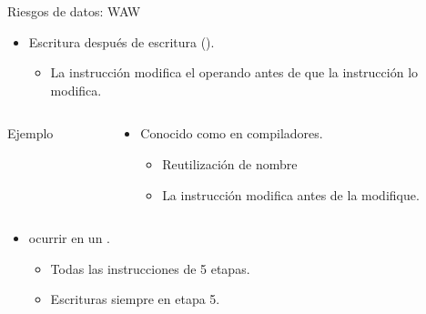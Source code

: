 \begin{frame}[t,fragile]{Riesgos de datos: WAW}
\begin{itemize}
  \item Escritura después de escritura ().
    \begin{itemize}
      \item La instrucción  modifica el operando antes de que la
            instrucción  lo modifica.
    \end{itemize}
\end{itemize}
\begin{columns}
\begin{column}{.25\textwidth}
\begin{block}{Ejemplo}

\end{block}
\end{column}
\begin{column}{.75\textwidth}
\begin{itemize}
  \item Conocido como  en compiladores.
    \begin{itemize}
      \item Reutilización de nombre
      \item La instrucción  modifica 
            antes de  la modifique.
    \end{itemize}
\end{itemize}
\end{column}
\end{columns}
\begin{itemize}
  \item {} ocurrir en un .
  \begin{itemize}
    \item Todas las instrucciones de 5 etapas.
    \item Escrituras siempre en etapa 5.
  \end{itemize}
\end{itemize}
\end{frame}

